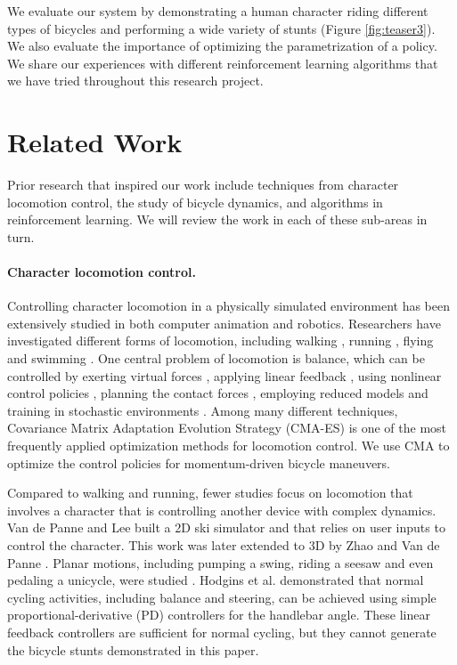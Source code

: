 We evaluate our system by demonstrating a human character riding different types of bicycles and performing a wide variety of stunts (Figure \ref{fig:teaser3}). We also evaluate the importance of optimizing the parametrization of a policy. We share our experiences with different reinforcement learning algorithms that we have tried throughout this research project.

\section{Related Work}
Prior research that inspired our work include techniques from character locomotion control, the study of bicycle dynamics, and algorithms in reinforcement learning. We will review the work in each of these sub-areas in turn.

\paragraph{Character locomotion control.} Controlling character locomotion in a physically simulated environment has been extensively studied in both computer animation and robotics. Researchers have investigated different forms of locomotion, including walking \cite{Yin:2007,Wang:2012}, running \cite{Hodgins:1995:AHA,Kwon:2010}, flying \cite{Wu:2003} and swimming \cite{Grzeszczuk:1995,Tan:2011}. One central problem of locomotion is balance, which can be controlled by exerting virtual forces \cite{Pratt2001,Coros2010}, applying linear feedback \cite{Laszlo:1996,Yin:2007,daSilva:2008,Coros2010}, using nonlinear control policies \cite{Muico:2009}, planning the contact forces \cite{Muico:2009,Tan:2012}, employing reduced models \cite{Tsai:2010,Kwon:2010,mordatch2010,Coros2010,Ye:2010} and training in stochastic environments \cite{Wang:2010}. Among many different techniques, Covariance Matrix Adaptation Evolution Strategy (CMA-ES) \cite{Hansen:2009} is one of the most frequently applied optimization methods for locomotion control. We use CMA to optimize the control policies for momentum-driven bicycle maneuvers.

Compared to walking and running, fewer studies focus on locomotion that involves a character that is controlling another device with complex dynamics. Van de Panne and Lee \cite{vandepanne:2003} built a 2D ski simulator and that relies on user inputs to control the character. This work was later extended to 3D by Zhao and Van de Panne \cite{Zhao:2005}. Planar motions, including pumping a swing, riding a seesaw and even pedaling a unicycle, were studied \cite{Hodgins:1992}. Hodgins et al. \cite{Hodgins:1995:AHA} demonstrated that normal cycling activities, including balance and steering, can be achieved using simple proportional-derivative (PD) controllers for the handlebar angle. These linear feedback controllers are sufficient for normal cycling, but they cannot generate the bicycle stunts demonstrated in this paper.

